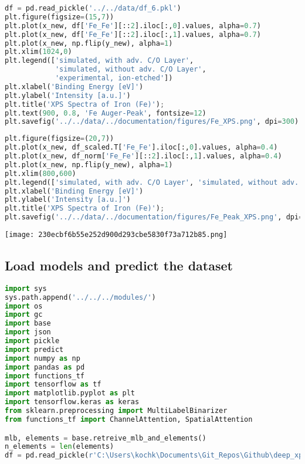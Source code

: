 \begin{lstlisting}[language=Python]
df = pd.read_pickle('../../data/df_6.pkl')
plt.figure(figsize=(15,7))
plt.plot(x_new, df['Fe_Fe'][::2].iloc[:,0].values, alpha=0.7)
plt.plot(x_new, df['Fe_Fe'][::2].iloc[:,1].values, alpha=0.7)
plt.plot(x_new, np.flip(y_new), alpha=1)
plt.xlim(1024,0)
plt.legend(['simulated, with adv. C/O Layer',
            'simulated, without adv. C/O Layer',
            'experimental, ion-etched'])
plt.xlabel('Binding Energy [eV]')
plt.ylabel('Intensity [a.u.]')
plt.title('XPS Spectra of Iron (Fe)');
plt.text(900, 0.8, 'Fe Auger-Peak', fontsize=12)
plt.savefig('../../data/../documentation/figures/Fe_XPS.png', dpi=300)
\end{lstlisting}

\begin{lstlisting}[language=Python]
plt.figure(figsize=(20,7))
plt.plot(x_new, df_scaled.T['Fe_Fe'].iloc[:,0].values, alpha=0.4)
plt.plot(x_new, df_norm['Fe_Fe'][::2].iloc[:,1].values, alpha=0.4)
plt.plot(x_new, np.flip(y_new), alpha=1)
plt.xlim(800,600)
plt.legend(['simulated, with adv. C/O Layer', 'simulated, without adv. C/O Layer', 'experimental, ion-etched'])
plt.xlabel('Binding Energy [eV]')
plt.ylabel('Intensity [a.u.]')
plt.title('XPS Spectra of Iron (Fe)');
plt.savefig('../../data/../documentation/figures/Fe_Peak_XPS.png', dpi=300)
\end{lstlisting}

\texttt{[image: 230ecbf6b55e252d900d293cbe5830f73a712b85.png]}

\hypertarget{load-models-and-predict-the-dataset}{%
\subsection{Load models and predict the
dataset}\label{load-models-and-predict-the-dataset}}

\begin{lstlisting}[language=Python]
import sys
sys.path.append('../../../modules/')
import os
import gc
import base
import json
import pickle
import predict
import numpy as np
import pandas as pd
import functions_tf
import tensorflow as tf
import matplotlib.pyplot as plt
import tensorflow.keras as keras
from sklearn.preprocessing import MultiLabelBinarizer
from functions_tf import ChannelAttention, SpatialAttention

mlb, elements = base.retreive_mlb_and_elements()
n_elements = len(elements)
df = pd.read_pickle(r'C:\Users\kochk\Documents\Git_Repos\Github\deep_xps\data\experimental_data_elemental.pkl')
\end{lstlisting}


